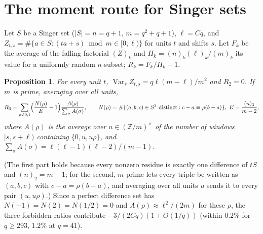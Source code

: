 \documentclass[11pt]{article}
\newtheorem{proposition}{Proposition}
\begin{document}
\section{The moment route for Singer sets}
Let $S$ be a Singer set \cite{Si} ($|S|=n=q+1$, $m=q^2+q+1$), $\ell=Cq$, and $Z_{t,s}=\#\{a\in S:(ta+s)\bmod m\in[0,\ell)\}$ for
units $t$ and shifts $s$. Let $F_k$ be the average of the falling factorial $(Z)_k$ and $H_k=(n)_k(\ell)_k/(m)_k$ its value for a
uniformly random $n$-subset; $R_k=F_k/H_k-1$.
\begin{proposition}
For every unit $t$, $\operatorname{Var}_s Z_{t,s}=q\ell(m-\ell)/m^2$ and $R_2=0$. If $m$ is prime, averaging over all units,
\[ R_3=\sum_{\rho\ne0,1}\Bigl(\frac{N(\rho)}{E}-1\Bigr)\frac{A(\rho)}{\sum_\sigma A(\sigma)},\qquad
N(\rho)=\#\{(a,b,c)\in S^3\ \text{distinct}: c-a\equiv\rho(b-a)\},\ E=\frac{(n)_3}{m-2},\]
where $A(\rho)$ is the average over $u\in(\mathbb Z/m)^\times$ of the number of windows $[s,s+\ell)$ containing $\{0,u,u\rho\}$, and
$\sum_\sigma A(\sigma)=\ell(\ell-1)(\ell-2)/(m-1)$.
\end{proposition}
(The first part holds because every nonzero residue is exactly one difference of $tS$ and $(n)_2=m-1$; for the second, $m$ prime
lets every triple be written as $(a,b,c)$ with $c-a=\rho(b-a)$, and averaging over all units $u$ sends it to every pair $(u,u\rho)$.) Since a perfect difference set
has $N(-1)=N(2)=N(1/2)=0$ and $A(\rho)\approx\ell^2/(2m)$ for these $\rho$, the three forbidden ratios contribute
$-3/(2Cq)(1+O(1/q))$ (within $0.2\%$ for $q\ge293$, $1.2\%$ at $q=41$).
\end{document}
